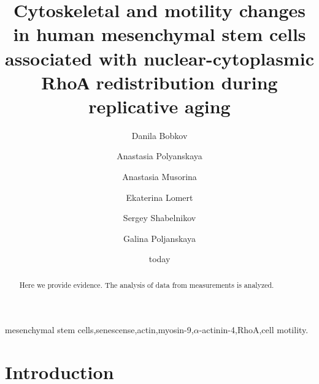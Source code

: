 \documentclass[english,authoryear]{elsarticle}
\title{Cytoskeletal and motility changes in human mesenchymal stem cells associated with nuclear-cytoplasmic RhoА redistribution during replicative aging}
\begin{document}
\date{today}

\author[rvt]{Danila Bobkov}
\author[add]{Anastasia Polyanskaya}
\author[rvt]{Anastasia Musorina}
\author[rvt]{Ekaterina Lomert}
\author[rvt]{Sergey Shabelnikov}
\author[rvt]{Galina Poljanskaya}
\address[rvt]{Institute of Cytology of the Russian Academy of Science, 194064 Tikhoretsky ave. 4, St-Petersburg, Russia }
\address[add]{Centre for Study of Things}


\begin{abstract}
Here we provide evidence.
The analysis of data from measurements is analyzed.
\end{abstract}

\begin{keyword}
mesenchymal stem cells\sep senescense\sep actin\sep myosin-9\sep $\alpha$-actinin-4\sep RhoA\sep cell motility.
\end{keyword}

\maketitle
\section{Introduction}
\end{document}
